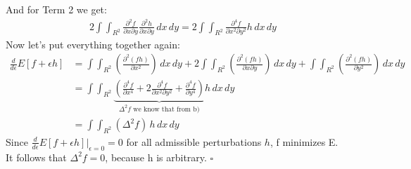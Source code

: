 \documentclass{article}
\begin{document}
And for Term 2 we get:
\begin{align*}
	2\int \int_{R^2} \frac{\partial^2 f}{\partial x \partial y} \frac{\partial^2 h}{\partial x \partial y} \, dx\, dy = 2\int \int_{R^2} \frac{\partial^4 f}{\partial x^2 \partial y^2} h \, dx\, dy
\end{align*}
Now let's put everything together again:
\begin{align*}
	\frac{d}{d\epsilon}E\left[f+\epsilon h\right] &= \int \int_{R^2} \left(\frac{\partial^2(f h)}{\partial x^2}\right) \, dx\, dy + 2\int \int_{R^2} \left(\frac{\partial^2(f h)}{\partial x \partial y}\right) \, dx\, dy + \int \int_{R^2} \left(\frac{\partial^2(f h)}{\partial y^2}\right) \, dx\, dy\\
	&= \int \int_{R^2} \underbrace{\left(\frac{\partial^4 f}{\partial x^4} + 2 \frac{\partial^4 f}{\partial x^2 \partial y^2} + \frac{\partial^4 f}{\partial y^4} \right)}_{\Delta^2 f \text{ we know that from b)}} h \, dx\, dy\\
	&= \int \int_{R^2} (\Delta^2 f) \, h \, dx\, dy
\end{align*}
Since $\frac{d}{d\epsilon}E\left[f+\epsilon h\right]\Bigg|_{\epsilon=0} = 0$ for all admissible perturbations $h$, f minimizes E.\\
It follows that $\Delta^2 f = 0$, because h is arbitrary. $\square$
\end{document}
